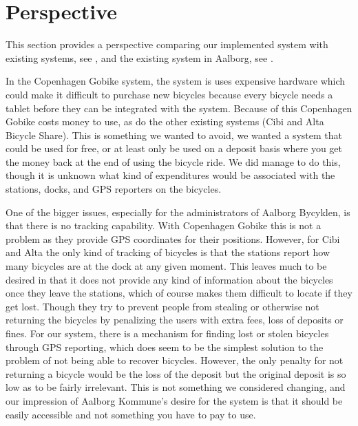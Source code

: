 \section{Perspective}
This section provides a perspective comparing our implemented system with existing systems, see , and the existing system in Aalborg, see .

In the Copenhagen Gobike system, the system is uses expensive hardware which could make it difficult to purchase new bicycles because every bicycle needs a tablet before they can be integrated with the system.
Because of this Copenhagen Gobike costs money to use, as do the other existing systems (Cibi and Alta Bicycle Share). 
This is something we wanted to avoid, we wanted a system that could be used for free, or at least only be used on a deposit basis where you get the money back at the end of using the bicycle ride. 
We did manage to do this, though it is unknown what kind of expenditures would be associated with the stations, docks, and GPS reporters on the bicycles. 

One of the bigger issues, especially for the administrators of Aalborg Bycyklen, is that there is no tracking capability. 
With Copenhagen Gobike this is not a problem as they provide GPS coordinates for their positions.
However, for Cibi and Alta the only kind of tracking of bicycles is that the stations report how many bicycles are at the dock at any given moment.
This leaves much to be desired in that it does not provide any kind of information about the bicycles once they leave the stations, which of course makes them difficult to locate if they get lost.
Though they try to prevent people from stealing or otherwise not returning the bicycles by penalizing the users with extra fees, loss of deposits or fines.
For our system, there is a mechanism for finding lost or stolen bicycles through GPS reporting, which does seem to be the simplest solution to the problem of not being able to recover bicycles.
However, the only penalty for not returning a bicycle would be the loss of the deposit but the original deposit is so low as to be fairly irrelevant.
This is not something we considered changing, and our impression of Aalborg Kommune's desire for the system is that it should be easily accessible and not something you have to pay to use.

